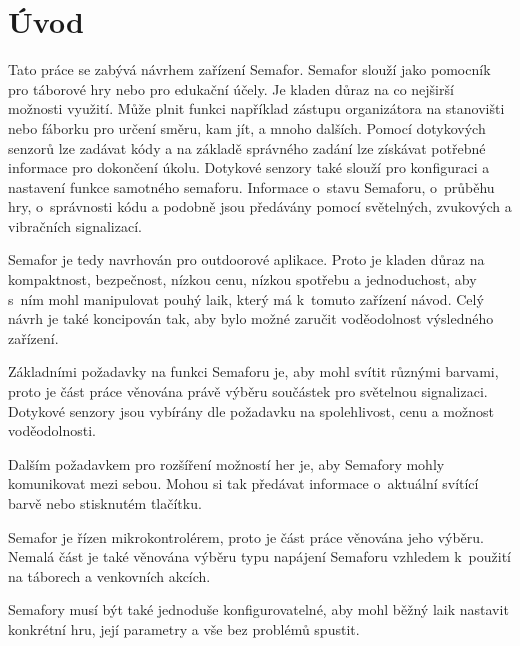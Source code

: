 \chapter*{Úvod}
{}
Tato práce se zabývá návrhem zařízení Semafor. Semafor slouží jako pomocník pro táborové hry nebo pro edukační účely. Je kladen důraz na co 
nejširší možnosti využití. Může plnit funkci například zástupu organizátora na stanovišti nebo fáborku pro určení směru, kam jít, a mnoho 
dalších. Pomocí dotykových senzorů lze zadávat kódy a na základě správného zadání lze získávat potřebné informace pro dokončení úkolu. Dotykové
senzory také slouží pro konfiguraci a nastavení funkce samotného semaforu. Informace o~stavu Semaforu, o~průběhu hry, o~správnosti kódu a podobně
jsou předávány pomocí světelných, zvukových a vibračních signalizací. 

Semafor je tedy navrhován pro outdoorové aplikace. Proto je kladen důraz na kompaktnost, bezpečnost, nízkou cenu, nízkou spotřebu a jednoduchost, 
aby s~ním mohl manipulovat pouhý laik, který má k~tomuto zařízení návod. Celý návrh je také koncipován tak, aby bylo možné zaručit voděodolnost 
výsledného zařízení. 

Základními požadavky na funkci Semaforu je, aby mohl svítit různými barvami, proto je část práce věnována právě výběru součástek pro světelnou 
signalizaci. Dotykové senzory jsou vybírány dle požadavku na spolehlivost, cenu a možnost voděodolnosti.

Dalším požadavkem pro rozšíření možností her je, aby Semafory mohly komunikovat mezi sebou. Mohou si tak předávat informace o~aktuální svítící 
barvě nebo stisknutém tlačítku. 

Semafor je řízen mikrokontrolérem, proto je část práce věnována jeho výběru. Nemalá část je také věnována výběru typu napájení Semaforu vzhledem 
k~použití na táborech a venkovních akcích.  

Semafory musí být také jednoduše konfigurovatelné, aby mohl běžný laik nastavit konkrétní hru, její parametry a vše bez problémů spustit. 



